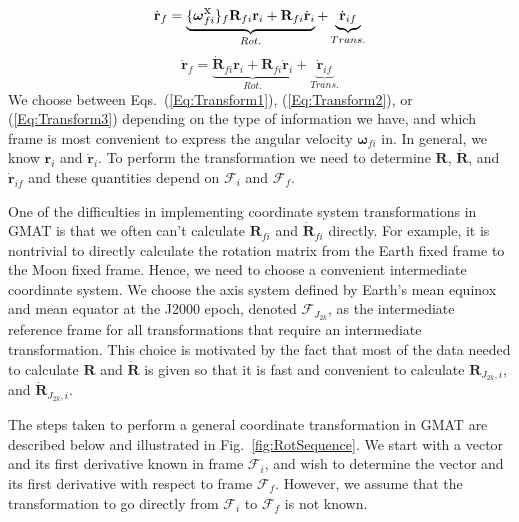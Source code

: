 %
\begin{equation}
    \dot{\mathbf{r}}_{f}  = \underbrace{\{\mbox{\boldmath{$\omega $}}^{\mbox{x}}_{fi}\}_f\mathbf{R}_{fi}\mathbf{r}_{i} + \mathbf{R}_{fi}\dot{\mathbf{r}}_{i}}_{Rot.}
     + \underbrace{\dot{\mathbf{r}}_{if}}_{Trans.} \label{Eq:Transform2}
\end{equation}
%
\begin{equation}
     \dot{\mathbf{r}}_{f} = \underbrace{\dot{\mathbf{R}}_{fi}\mathbf{r}_{i} + \mathbf{R}_{fi}\dot{\mathbf{r}}_{i}
     }_{Rot.}+  \underbrace{\dot{\mathbf{r}}_{if}}_{Trans.}\label{Eq:Transform3}
\end{equation}
%
We choose between Eqs.~(\ref{Eq:Transform1}), (\ref{Eq:Transform2}),
or (\ref{Eq:Transform3}) depending on the type of information we
have, and which frame is most convenient to express the angular
velocity $\boldsymbol \omega_{fi}$ in.  In general, we know
$\mathbf{r}_{i}$ and $\dot{\mathbf{r}}_{i}$.  To perform the
transformation we need to determine $\mathbf{R}$,
$\dot{\mathbf{R}}$, and $\dot{\mathbf{r}}_{if}$ and these quantities
depend on $\mathcal{F}_i$ and $\mathcal{F}_f$.

One of the difficulties in implementing coordinate system
transformations in GMAT is that we often can't calculate
$\mathbf{R}_{fi}$ and $\dot{\mathbf{R}}_{fi}$ directly.  For
example, it is nontrivial to directly calculate the rotation matrix
from the Earth fixed frame to the Moon fixed frame.  Hence, we need
to choose a convenient intermediate coordinate system. We choose the
axis system defined by Earth's mean equinox and mean equator at the
J2000 epoch, denoted $\mathcal{F}_{J_{2k}}$, as the intermediate
reference frame for all transformations that require an intermediate
transformation. This choice is motivated by the fact that most of
the data needed to calculate $\mathbf{R}$ and $\dot{\mathbf{R}}$ is
given so that it is fast and convenient to calculate
$\mathbf{R}_{J_{2k},i}$, and $\dot{\mathbf{R}}_{J_{2k},i}$.

The steps taken to perform a general coordinate transformation in
GMAT are described below and illustrated in
Fig.~\ref{fig:RotSequence}.  We start with a vector and its first derivative known in
frame $\mathcal{F}_i$, and wish to determine the vector and its
first derivative with respect to frame $\mathcal{F}_f$.  However, we
assume that the transformation to go directly from $\mathcal{F}_i$
to $\mathcal{F}_f$ is not known.

